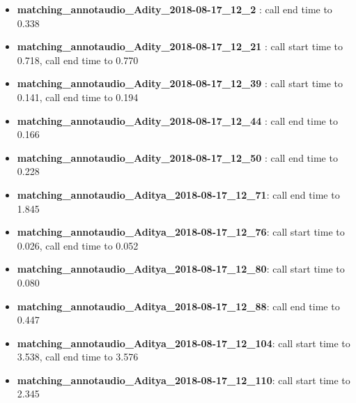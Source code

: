 \documentclass[11pt]{article}
\providecommand{\tightlist}{%
      \setlength{\itemsep}{0pt}\setlength{\parskip}{0pt}}
\begin{document}
\begin{itemize}
\tightlist
\item
  \textbf{matching\_annotaudio\_Adity\_2018-08-17\_12\_2} : call end
  time to 0.338
\item
  \textbf{matching\_annotaudio\_Adity\_2018-08-17\_12\_21} : call start
  time to 0.718, call end time to 0.770
\item
  \textbf{matching\_annotaudio\_Adity\_2018-08-17\_12\_39} : call start
  time to 0.141, call end time to 0.194
\item
  \textbf{matching\_annotaudio\_Adity\_2018-08-17\_12\_44} : call end
  time to 0.166
\item
  \textbf{matching\_annotaudio\_Adity\_2018-08-17\_12\_50} : call end
  time to 0.228
\item
  \textbf{matching\_annotaudio\_Aditya\_2018-08-17\_12\_71}: call end
  time to 1.845
\item
  \textbf{matching\_annotaudio\_Aditya\_2018-08-17\_12\_76}: call start
  time to 0.026, call end time to 0.052
\item
  \textbf{matching\_annotaudio\_Aditya\_2018-08-17\_12\_80}: call start
  time to 0.080
\item
  \textbf{matching\_annotaudio\_Aditya\_2018-08-17\_12\_88}: call end
  time to 0.447
\item
  \textbf{matching\_annotaudio\_Aditya\_2018-08-17\_12\_104}: call start
  time to 3.538, call end time to 3.576
\item
  \textbf{matching\_annotaudio\_Aditya\_2018-08-17\_12\_110}: call start
  time to 2.345
\end{itemize}
\end{document}
